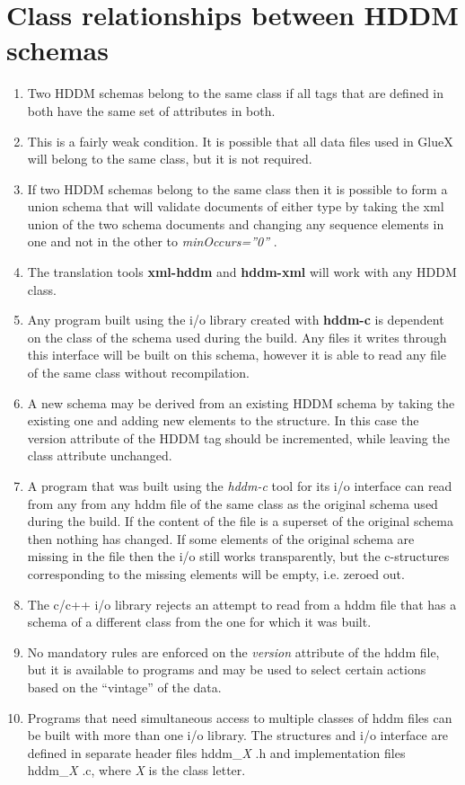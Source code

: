 \documentclass[10pt]{article}
\begin{document}
\section{Class relationships between HDDM schemas}
\begin{enumerate}
\item  Two HDDM schemas belong to the same class if all tags that are defined in both have the same set of attributes in both. 
\item  This is a fairly weak condition. It is possible that all data files used in GlueX will belong to the same class, but it is not required. 
\item  If two HDDM schemas belong to the same class then it is possible to form a union schema that will validate documents of either type by taking the xml union of the two schema documents and changing any sequence elements in one and not in the other to \emph{minOccurs=''0''}
. 
\item  The translation tools \textbf{xml-hddm}
 and \textbf{hddm-xml}
 will work with any HDDM class. 
\item  Any program built using the i/o library created with \textbf{hddm-c}
 is dependent on the class of the schema used during the build. Any files it writes through this interface will be built on this schema, however it is able to read any file of the same class without recompilation. 
\item  A new schema may be derived from an existing HDDM schema by taking the existing one and adding new elements to the structure. In this case the version attribute of the HDDM tag should be incremented, while leaving the class attribute unchanged. 
\item  A program that was built using the \emph{hddm-c}
 tool for its i/o interface can read from any from any hddm file of the same class as the original schema used during the build. If the content of the file is a superset of the original schema then nothing has changed. If some elements of the original schema are missing in the file then the i/o still works transparently, but the c-structures corresponding to the missing elements will be empty, i.e. zeroed out. 
\item  The c/c++ i/o library rejects an attempt to read from a hddm file that has a schema of a different class from the one for which it was built. 
\item  No mandatory rules are enforced on the \emph{version}
 attribute of the hddm file, but it is available to programs and may be used to select certain actions based on the ``vintage'' of the data. 
\item  Programs that need simultaneous access to multiple classes of hddm files can be built with more than one i/o library. The structures and i/o interface are defined in separate header files hddm\_\emph{X}
.h and implementation files hddm\_\emph{X}
.c, where \emph{X}
 is the class letter. 

\end{enumerate}
\end{document}
